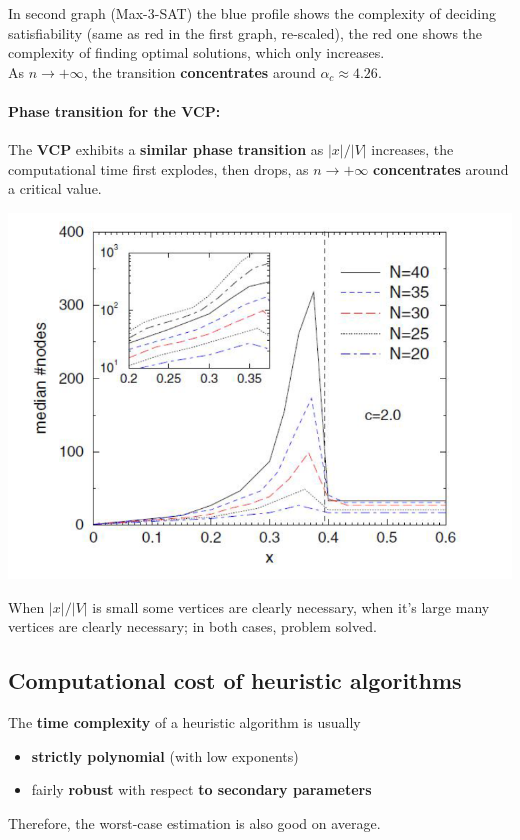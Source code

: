 In second graph (Max-3-SAT) the blue profile shows the complexity of deciding satisfiability (same as red in the first graph, re-scaled), the red one shows the complexity of finding optimal solutions, which only increases.\\

As $n \rightarrow + \infty$, the transition \textbf{concentrates} around $\alpha_c \approx 4.26$.\\

\newpage

\paragraph{Phase transition for the VCP:} The \textbf{VCP} exhibits a \textbf{similar phase transition} as $|x|/|V|$ increases, the computational time first explodes, then drops, as $n \rightarrow +\infty$ \textbf{concentrates} around a critical value.
\begin{center}
	\includegraphics[width=0.7\columnwidth]{img/PhaseT2}
\end{center}
When $|x|/|V|$ is small some vertices are clearly necessary, when it's large many vertices are clearly necessary; in both cases, problem solved.\\

\vfill 

\subsection*{Computational cost of heuristic algorithms}
The \textbf{time complexity} of a heuristic algorithm is usually
\begin{itemize}
	\item \textbf{strictly polynomial} (with low exponents)
	\item fairly \textbf{robust} with respect \textbf{to secondary parameters}
\end{itemize}
Therefore, the worst-case estimation is also good on average.\\

